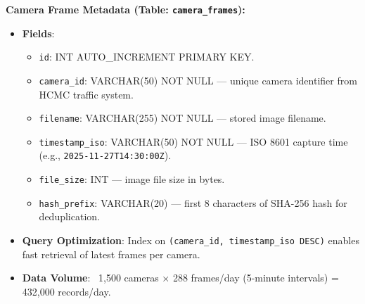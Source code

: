\textbf{Camera Frame Metadata (Table: \texttt{camera\_frames}):}
\begin{itemize}
    \item \textbf{Fields}:
    \begin{itemize}
        \item \texttt{id}: INT AUTO\_INCREMENT PRIMARY KEY.
        \item \texttt{camera\_id}: VARCHAR(50) NOT NULL — unique camera identifier from HCMC traffic system.
        \item \texttt{filename}: VARCHAR(255) NOT NULL — stored image filename.
        \item \texttt{timestamp\_iso}: VARCHAR(50) NOT NULL — ISO 8601 capture time (e.g., \texttt{2025-11-27T14:30:00Z}).
        \item \texttt{file\_size}: INT — image file size in bytes.
        \item \texttt{hash\_prefix}: VARCHAR(20) — first 8 characters of SHA-256 hash for deduplication.
    \end{itemize}
    \item \textbf{Query Optimization}: Index on \texttt{(camera\_id, timestamp\_iso DESC)} enables fast retrieval of latest frames per camera.
    \item \textbf{Data Volume}: ~1,500 cameras × 288 frames/day (5-minute intervals) = 432,000 records/day.
\end{itemize}

